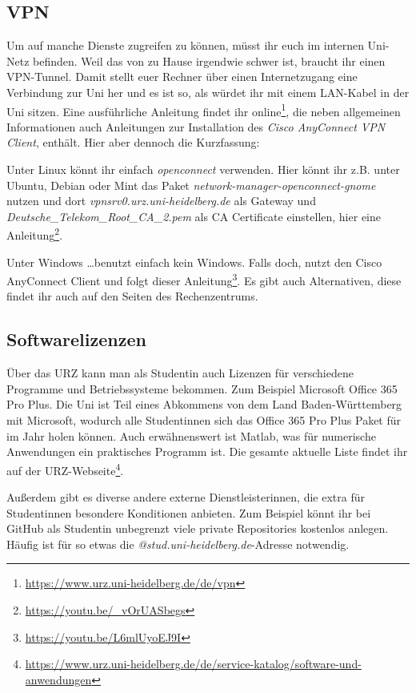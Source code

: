 \subsection{VPN}
Um auf manche Dienste zugreifen zu können, müsst ihr euch im internen Uni-Netz befinden. Weil das von zu Hause irgendwie schwer ist, braucht ihr einen VPN-Tunnel. Damit stellt euer Rechner über einen Internetzugang eine Verbindung zur Uni her und es ist so, als würdet ihr mit einem LAN-Kabel in der Uni sitzen. Eine ausführliche Anleitung findet ihr online\footnote{\url{https://www.urz.uni-heidelberg.de/de/vpn}}, die neben allgemeinen Informationen auch Anleitungen zur Installation des \emph{Cisco AnyConnect VPN Client}, enthält. Hier aber dennoch die Kurzfassung:

Unter Linux könnt ihr einfach \emph{openconnect} verwenden. Hier könnt ihr z.B. unter Ubuntu, Debian oder Mint das Paket \emph{network-manager-openconnect-gnome} nutzen und dort \emph{vpnsrv0.urz.uni-heidelberg.de} als Gateway und \emph{Deutsche\_Telekom\_Root\_CA\_2.pem} als CA Certificate einstellen, hier eine Anleitung\footnote{\url{https://youtu.be/_vOrUASbegs}}.

Unter Windows \ldots benutzt einfach kein Windows. Falls doch, nutzt den Cisco AnyConnect Client und folgt dieser Anleitung\footnote{\url{https://youtu.be/L6mlUyoEJ9I}}. Es gibt auch Alternativen, diese findet ihr auch auf den Seiten des Rechenzentrums.


\subsection{Softwarelizenzen}

Über das URZ kann man als Studentin auch Lizenzen für verschiedene Programme und Betriebssysteme bekommen. Zum Beispiel Microsoft Office 365 Pro Plus. Die Uni ist Teil eines Abkommens von dem Land Baden-Württemberg mit Microsoft, wodurch alle Studentinnen sich das Office 365 Pro Plus Paket für  im Jahr holen können. Auch erwähnenswert ist Matlab, was für numerische Anwendungen ein praktisches Programm ist. Die gesamte aktuelle Liste findet ihr auf der URZ-Webseite\footnote{\url{https://www.urz.uni-heidelberg.de/de/service-katalog/software-und-anwendungen}}.

Außerdem gibt es diverse andere externe Dienstleisterinnen, die extra für Studentinnen besondere Konditionen anbieten. Zum Beispiel könnt ihr bei GitHub als Studentin unbegrenzt viele private Repositories kostenlos anlegen. Häufig ist für so etwas die \emph{@stud.uni-heidelberg.de}-Adresse notwendig.
